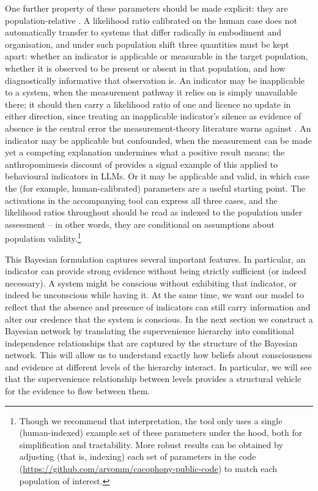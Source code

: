 \documentclass[11pt, a4paper, onecolumn, gdm]{google}
\begin{document}
One further property of these parameters should be made explicit: they are population-relative \citep{bayne2024}.
A likelihood ratio calibrated on the human case does not automatically transfer to systems that differ radically in embodiment and organisation, and under such population shift three quantities must be kept apart: whether an indicator is applicable or measurable in the target population, whether it is observed to be present or absent in that population, and how diagnostically informative that observation is.
An indicator may be inapplicable to a system, when the measurement pathway it relies on is simply unavailable there; it should then carry a likelihood ratio of one and licence no update in either direction, since treating an inapplicable indicator's silence as evidence of absence is the central error the measurement-theory literature warns against \citep{peters2026}.
An indicator may be applicable but confounded, when the measurement can be made yet a competing explanation undermines what a positive result means; the anthropomimesis discount of  provides a signal example of this applied to behavioural indicators in LLMs.
Or it may be applicable and valid, in which case the (for example, human-calibrated) parameters are a useful starting point.
The activations in the accompanying tool can express all three cases, and the likelihood ratios throughout should be read as indexed to the population under assessment -- in other words, they are conditional on assumptions about population validity.\footnote{Though we recommend that interpretation, the tool only uses a single (human-indexed) example set of these parameters under the hood, both for simplification and tractability. More robust results can be obtained by adjusting (that is, indexing) each set of parameters in the code (\url{https://github.com/arvomm/cacophony-public-code}) to match each population of interest.}

This Bayesian formulation captures several important features.
In particular, an indicator can provide strong evidence without being strictly sufficient (or indeed necessary).
A system might be conscious without exhibiting that indicator, or indeed be unconscious while having it.
At the same time, we want our model to reflect that the absence and presence of indicators can still carry information and alter our credence that the system is conscious.
In the next section we construct a Bayesian network by translating the supervenience hierarchy into conditional independence relationships that are captured by the structure of the Bayesian network.
This will allow us to understand exactly how beliefs about consciousness and evidence at different levels of the hierarchy interact.
In particular, we will see that the supervenience relationship between levels provides a structural vehicle for the evidence to flow between them.
\end{document}
